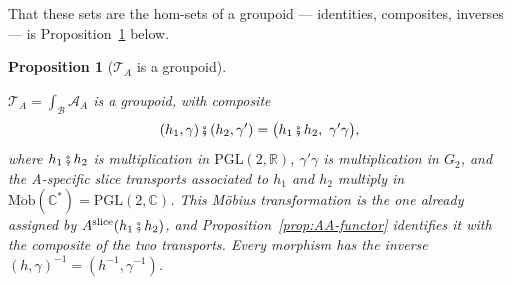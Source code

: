 \documentclass[11pt]{article}
\newcommand{\CC}{\mathbb{C}}
\newcommand{\RR}{\mathbb{R}}
\providecommand{\lean}[1]{}
\providecommand{\notready}{}
\providecommand{\uses}[1]{}
\theoremstyle{plain}
\newtheorem{proposition}[theorem]{Proposition}
\theoremstyle{definition}
\theoremstyle{remark}
\begin{document}
That these sets are the hom-sets of a groupoid --- identities,
composites, inverses --- is Proposition~\ref{prop:total-groupoid} below.

\begin{proposition}[$\mathcal T_A$ is a groupoid]\label{prop:total-groupoid}
\lean{ASection.ambientTotalCategory, ASection.ambientTotalGroupoid,
grothendieckGrpdGroupoid, CategoryTheory.Grothendieck}
\notready
\uses{prop:AA-functor}
$\mathcal T_A=\int_{\mathcal B}\mathcal A_A$ is a groupoid, with composite
\[
  (h_1,\gamma)\fatsemi(h_2,\gamma')
    =\bigl(h_1\fatsemi h_2,\ \gamma'\gamma\bigr),
\]
where $h_1\fatsemi h_2$ is multiplication in $\mathrm{PGL}(2,\RR)$,
$\gamma'\gamma$ is multiplication in $G_2$, and the A-specific slice
transports associated to $h_1$ and $h_2$ multiply in
$\operatorname{M\ddot ob}(\CC^*)=\mathrm{PGL}(2,\CC)$.  This M\"obius
transformation is the one already assigned by
$A^{\mathrm{slice}}(h_1\fatsemi h_2)$, and Proposition~\ref{prop:AA-functor}
identifies it with the composite of the two transports. Every morphism has the inverse
$(h,\gamma)^{-1}=(h^{-1},\gamma^{-1})$.
\end{proposition}
\end{document}
